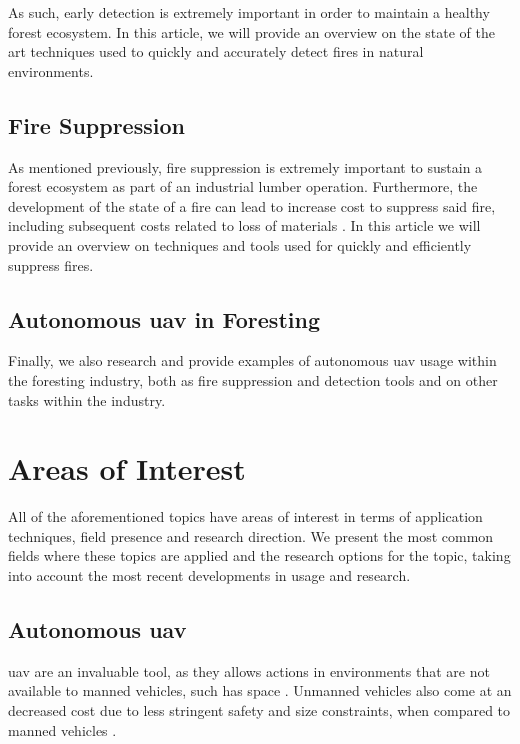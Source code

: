\documentclass[runningheads]{llncs}
\begin{document}
As such, early detection is extremely important in order to maintain a healthy forest ecosystem. In this article, we will provide an overview on the state of the art techniques used to quickly and accurately detect fires in natural environments.

\subsection{Fire Suppression}

As mentioned previously, fire suppression is extremely important to sustain a forest ecosystem as part of an industrial lumber operation. Furthermore, the development of the state of a fire can lead to increase cost to suppress said fire, including subsequent costs related to loss of materials \cite{Knowling_2016}. In this article we will provide an overview on techniques and tools used for quickly and efficiently suppress fires.

\subsection{Autonomous \acrshort{uav} in Foresting}

Finally, we also research and provide examples of autonomous \acrshort{uav} usage within the foresting industry, both as fire suppression and detection tools and on other tasks within the industry.

\section{Areas of Interest}

All of the aforementioned topics have areas of interest in terms of application techniques, field presence and research direction. We present the most common fields where these topics are applied and the research options for the topic, taking into account the most recent developments in usage and research.

\subsection{Autonomous \acrshort{uav}}

\acrshort{uav} are an invaluable tool, as they allows actions in environments that are not available to manned vehicles, such has space \cite{drones6010004}. Unmanned vehicles also come at an decreased cost due to less stringent safety and size constraints, when compared to manned vehicles \cite{article12}.
\end{document}
